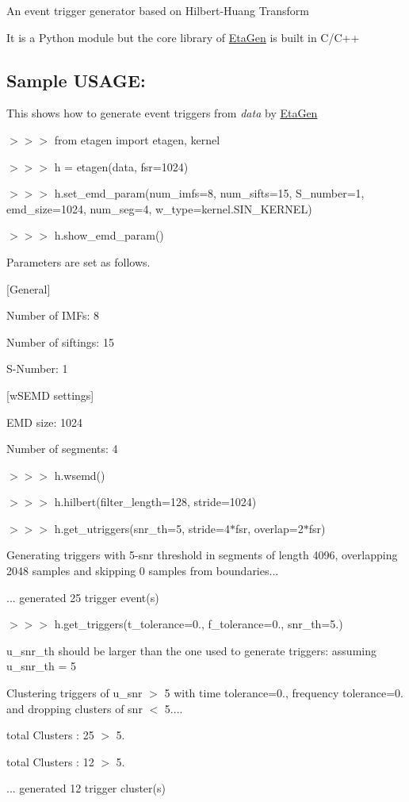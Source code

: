 An event trigger generator based on Hilbert-\/\-Huang Transform\par
 It is a Python module but the core library of \hyperlink{namespaceEtaGen}{Eta\-Gen} is built in C/\-C++

\subsection*{Sample U\-S\-A\-G\-E\-:}


\begin{DoxyItemize}
\item This shows how to generate event triggers from {\itshape data} by \hyperlink{namespaceEtaGen}{Eta\-Gen}\par
 $>$$>$$>$ from etagen import etagen, kernel

$>$$>$$>$ h = etagen(data, fsr=1024)

$>$$>$$>$ h.\-set\-\_\-emd\-\_\-param(num\-\_\-imfs=8, num\-\_\-sifts=15, S\-\_\-number=1, emd\-\_\-size=1024, num\-\_\-seg=4, w\-\_\-type=kernel.\-S\-I\-N\-\_\-\-K\-E\-R\-N\-E\-L)

$>$$>$$>$ h.\-show\-\_\-emd\-\_\-param()\par
 Parameters are set as follows.\par
 \mbox{[}General\mbox{]}\par
 Number of I\-M\-Fs\-: 8\par
 Number of siftings\-: 15\par
 S-\/\-Number\-: 1\par
 \mbox{[}w\-S\-E\-M\-D settings\mbox{]}\par
 E\-M\-D size\-: 1024\par
 Number of segments\-: 4

$>$$>$$>$ h.\-wsemd()

$>$$>$$>$ h.\-hilbert(filter\-\_\-length=128, stride=1024)

$>$$>$$>$ h.\-get\-\_\-utriggers(snr\-\_\-th=5, stride=4$\ast$fsr, overlap=2$\ast$fsr)\par
 Generating triggers with 5-\/snr threshold in segments of length 4096, overlapping 2048 samples and skipping 0 samples from boundaries...\par
 ... generated 25 trigger event(s)

$>$$>$$>$ h.\-get\-\_\-triggers(t\-\_\-tolerance=0., f\-\_\-tolerance=0., snr\-\_\-th=5.)\par
 u\-\_\-snr\-\_\-th should be larger than the one used to generate triggers\-: assuming u\-\_\-snr\-\_\-th = 5\par
 Clustering triggers of u\-\_\-snr $>$ 5 with time tolerance=0., frequency tolerance=0. and dropping clusters of snr $<$ 5....\par
 total Clusters \-: 25 $>$ 5.\par
 total Clusters \-: 12 $>$ 5.\par
 ... generated 12 trigger cluster(s)


\end{DoxyItemize}
